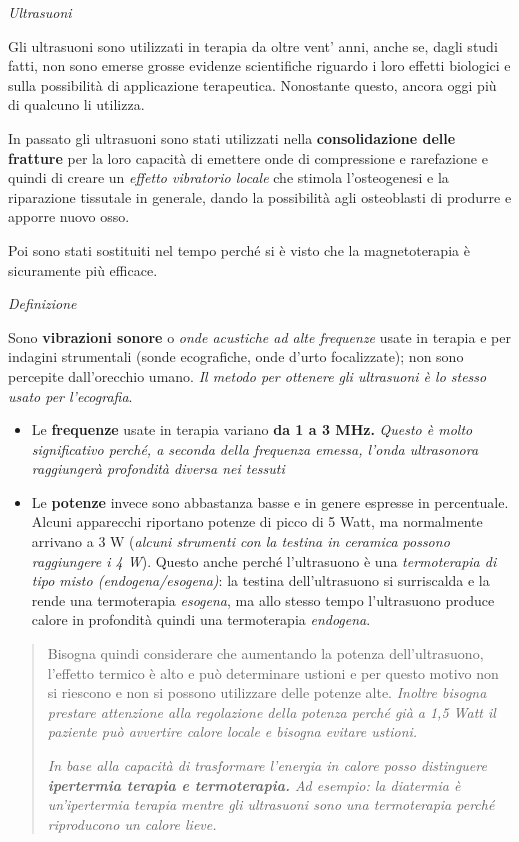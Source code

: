 \documentclass[]{article}
\date{}
\begin{document}
\emph{Ultrasuoni }

Gli ultrasuoni sono utilizzati in terapia da oltre vent' anni, anche se,
dagli studi fatti, non sono emerse grosse evidenze scientifiche riguardo
i loro effetti biologici e sulla possibilità di applicazione
terapeutica. Nonostante questo, ancora oggi più di qualcuno li utilizza.

In passato gli ultrasuoni sono stati utilizzati nella
\textbf{consolidazione delle fratture} per la loro capacità di emettere
onde di compressione e rarefazione e quindi di creare un \emph{effetto
vibratorio locale} che stimola l'osteogenesi e la riparazione tissutale
in generale, dando la possibilità agli osteoblasti di produrre e apporre
nuovo osso.

Poi sono stati sostituiti nel tempo perché si è visto che la
magnetoterapia è sicuramente più efficace.

\emph{Definizione}

Sono \textbf{vibrazioni sonore} o \emph{onde acustiche ad alte
frequenze} usate in terapia e per indagini strumentali (sonde
ecografiche, onde d'urto focalizzate); non sono percepite dall'orecchio
umano. \emph{Il metodo per ottenere gli ultrasuoni è lo stesso usato per
l\emph{'ecografia}}.

\begin{itemize}
\item
  Le \textbf{frequenze} usate in terapia variano \textbf{da 1 a 3 MHz.}
  \emph{Questo è molto significativo perché, a seconda della frequenza
  emessa, l'onda ultrasonora raggiungerà profondità diversa nei tessuti}
\item
  Le \textbf{potenze} invece sono abbastanza basse e in genere espresse
  in percentuale. Alcuni apparecchi riportano potenze di picco di 5
  Watt, ma normalmente arrivano a 3 W (\emph{alcuni strumenti con la
  testina in ceramica possono raggiungere i 4 W}). Questo anche perché
  l'ultrasuono è una \emph{termoterapia di tipo misto
  (\emph{endogena/esogena})}: la testina dell'ultrasuono si surriscalda
  e la rende una termoterapia \emph{esogena}, ma allo stesso tempo
  l'ultrasuono produce calore in profondità quindi una termoterapia
  \emph{endogena}.
\end{itemize}

\begin{quote}
Bisogna quindi considerare che aumentando la potenza dell'ultrasuono,
l'effetto termico è alto e può determinare ustioni e per questo motivo
non si riescono e non si possono utilizzare delle potenze alte.
\emph{Inoltre bisogna prestare attenzione alla regolazione della potenza
perché già a 1,5 Watt il paziente può avvertire calore locale e bisogna
evitare ustioni.}

\emph{In base alla capacità di trasformare l'energia in calore posso
distinguere \textbf{ipertermia terapia e termoterapia.} Ad esempio: la
diatermia è un'ipertermia terapia mentre gli ultrasuoni sono una
termoterapia perché riproducono un calore lieve.}
\end{quote}
\end{document}
